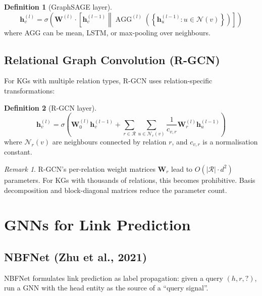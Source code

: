 \documentclass[11pt,a4paper,oneside,openany]{book}
\theoremstyle{definition}
\newtheorem{definition}{Definition}[chapter]
\theoremstyle{plain}
\theoremstyle{remark}
\newtheorem{remark}{Remark}[chapter]
\newcommand{\cR}{\mathcal{R}}
\begin{document}
\begin{definition}[GraphSAGE layer]
	$$\mathbf{h}_v^{(l)} = \sigma\!\left( \mathbf{W}^{(l)} \cdot \left[ \mathbf{h}_v^{(l-1)} \middle\| \operatorname{AGG}^{(l)}\!\left( \left\{ \mathbf{h}_u^{(l-1)} : u \in \mathcal{N}(v) \right\} \right) \right] \right)$$
	where AGG can be mean, LSTM, or max-pooling over neighbours.
\end{definition}

\subsection{Relational Graph Convolution (R-GCN)}

For KGs with multiple relation types, R-GCN uses relation-specific transformations:

\begin{definition}[R-GCN layer]
	$$\mathbf{h}_v^{(l)} = \sigma\!\left( \mathbf{W}_0^{(l)} \mathbf{h}_v^{(l-1)} + \sum_{r \in \cR} \sum_{u \in \mathcal{N}_r(v)} \frac{1}{c_{v,r}} \mathbf{W}_r^{(l)} \mathbf{h}_u^{(l-1)} \right)$$
	where $\mathcal{N}_r(v)$ are neighbours connected by relation $r$, and $c_{v,r}$ is a normalisation constant.
\end{definition}

\begin{remark}
	R-GCN's per-relation weight matrices $\mathbf{W}_r$ lead to $O(|\cR| \cdot d^2)$ parameters. For KGs with thousands of relations, this becomes prohibitive. Basis decomposition and block-diagonal matrices reduce the parameter count.
\end{remark}

\section{GNNs for Link Prediction}\label{sec:gnn-lp}

\subsection{NBFNet (Zhu et al., 2021)}

NBFNet formulates link prediction as label propagation: given a query $(h, r, ?)$, run a GNN with the head entity as the source of a ``query signal''.
\end{document}
